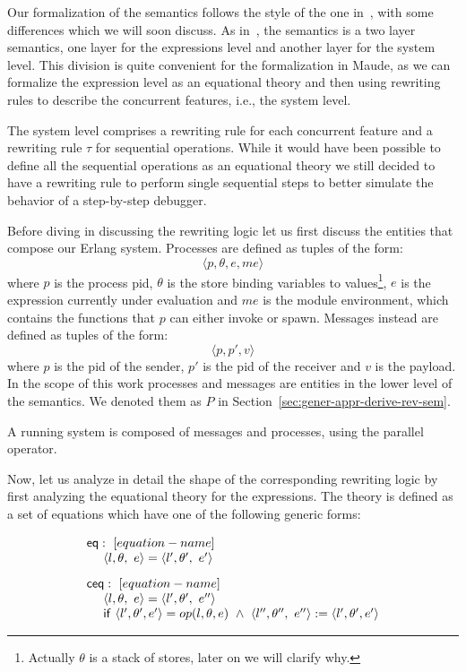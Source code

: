 \documentclass{article}[12pt,a4paper]
\theoremstyle{definition}
\begin{document}
Our formalization of the semantics follows the style of the one
in~\cite{Gonzalez-AbrilV21}, with some differences which we will soon discuss. As
in~\cite{Gonzalez-AbrilV21}, the semantics is a two
layer semantics, one layer for the expressions level and another layer for the system
level. This division is quite convenient for the formalization in Maude, as we
can formalize the expression level as an equational theory and then using rewriting
rules to describe the concurrent features, i.e., the system level.

The system level comprises a rewriting rule for each concurrent feature and a
rewriting rule $\tau$ for sequential operations. While it would have been
possible to
define all the sequential operations as an equational theory we still decided to
have a rewriting rule to perform single sequential steps to better simulate the
behavior of a step-by-step debugger.

Before diving in discussing the rewriting logic let us first
discuss the entities that compose our Erlang system.
Processes are defined as tuples of the form:
\[\langle p, \theta, e, me \rangle\]
where $p$ is the process pid, $\theta$ is the store binding variables to
values\footnote{Actually $\theta$ is a stack of stores, later on we will clarify
  why. }, $e$ is the expression currently under evaluation and $me$ is the
module environment, which contains the functions that $p$ can either invoke or
spawn.
Messages instead are defined as tuples of the form:
\[\langle p, p', v \rangle\]
where $p$ is the pid of the sender, $p'$ is the pid of the receiver and $v$ is
the payload. In the scope of this work processes and messages are entities in the
lower level of the semantics. We denoted them as $P$ in Section~\ref{sec:gener-appr-derive-rev-sem}.

A running system is composed of messages and processes, using the
parallel operator.

Now, let us analyze in detail the shape of the corresponding rewriting logic by first analyzing the equational theory for the expressions. The theory
is defined as a set of equations which have one of the following generic forms:

\[
  \begin{array}{l}
    \mathsf{eq}:~[equation-name]\\
    ~~~~\langle l,\theta,~e \rangle = \langle l',\theta',~e' \rangle\\[2ex]

    \mathsf{ceq}:~[equation-name]\\
    ~~~~\langle l,\theta,~e \rangle = \langle l',\theta',~e'' \rangle\\
    ~~~~\mathsf{if}~\langle l', \theta', e'\rangle =op(l,\theta,e)~\wedge~\langle
    l'',\theta'',~e'' \rangle := \langle l',\theta',e'\rangle

  \end{array}
\]
\end{document}
